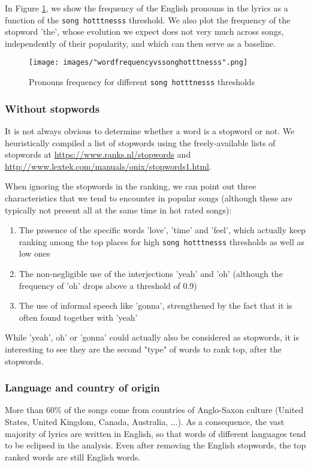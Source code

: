 \documentclass[11pt]{article}
\renewcommand\_{\textunderscore\allowbreak}
\begin{document}
In Figure \ref{fig:word_frequency_stopwords}, we show the frequency of the English pronouns in the lyrics as a function of the \texttt{song hotttnesss} threshold.
We also plot the frequency of the stopword 'the', whose evolution we expect does not very much across songs, independently of their popularity, and which can then serve as a baseline.
\begin{figure}[h!]
\centering
\captionsetup{width=1.0\textwidth}
\texttt{[image: images/"word\_frequency\_vs\_song\_hotttnesss".png]}
\caption{Pronouns frequency for different \texttt{song hotttnesss} thresholds}
\label{fig:word_frequency_stopwords}
\end{figure}

\subsubsection{Without stopwords}
It is not always obvious to determine whether a word is a stopword or not. We heuristically compiled a list of stopwords using the freely-available lists of stopwords at \url{https://www.ranks.nl/stopwords} and \url{http://www.lextek.com/manuals/onix/stopwords1.html}.

When ignoring the stopwords in the ranking, we can point out three characteristics that we tend to encounter in popular songs (although these are typically not present all at the same time in hot rated songs):
\begin{enumerate}
\itemsep 0mm
\item The presence of the specific words 'love', 'time' and 'feel', which actually keep ranking among the top places for high \texttt{song hotttnesss} thresholds as well as low ones
\item The non-negligible use of the interjections 'yeah' and 'oh' (although the frequency of 'oh' drops above a threshold of 0.9)
\item The use of informal speech like 'gonna', strengthened by the fact that it is often found together with 'yeah'
\end{enumerate}
While 'yeah', oh' or 'gonna' could actually also be considered as stopwords, it is interesting to see they are the second "type" of words to rank top, after the stopwords.

\subsubsection{Language and country of origin}
More than 60\% of the songs come from countries of Anglo-Saxon culture (United States, United Kingdom, Canada, Australia, ...). As a consequence, the vast majority of lyrics are written in English, so that words of different languages tend to be eclipsed in the analysis.
Even after removing the English stopwords, the top ranked words are still English words.
\end{document}
